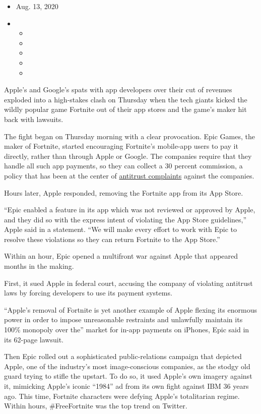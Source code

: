 \begin{itemize}
\item
  Aug. 13, 2020
\item
  \begin{itemize}
  \item
  \item
  \item
  \item
  \item
  \end{itemize}
\end{itemize}

Apple's and Google's spats with app developers over their cut of
revenues exploded into a high-stakes clash on Thursday when the tech
giants kicked the wildly popular game Fortnite out of their app stores
and the game's maker hit back with lawsuits.

The fight began on Thursday morning with a clear provocation. Epic
Games, the maker of Fortnite, started encouraging Fortnite's mobile-app
users to pay it directly, rather than through Apple or Google. The
companies require that they handle all such app payments, so they can
collect a 30 percent commission, a policy that has been at the center of
\href{https://www.nytimes3xbfgragh.onion/2020/06/16/business/apple-app-store-european-union-antitrust.html}{antitrust
complaints} against the companies.

Hours later, Apple responded, removing the Fortnite app from its App
Store.

``Epic enabled a feature in its app which was not reviewed or approved
by Apple, and they did so with the express intent of violating the App
Store guidelines,'' Apple said in a statement. ``We will make every
effort to work with Epic to resolve these violations so they can return
Fortnite to the App Store.''

Within an hour, Epic opened a multifront war against Apple that appeared
months in the making.

First, it sued Apple in federal court, accusing the company of violating
antitrust laws by forcing developers to use its payment systems.

``Apple's removal of Fortnite is yet another example of Apple flexing
its enormous power in order to impose unreasonable restraints and
unlawfully maintain its 100\% monopoly over the'' market for in-app
payments on iPhones, Epic said in its 62-page lawsuit.

Then Epic rolled out a sophisticated public-relations campaign that
depicted Apple, one of the industry's most image-conscious companies, as
the stodgy old guard trying to stifle the upstart. To do so, it used
Apple's own imagery against it, mimicking Apple's iconic ``1984'' ad
from its own fight against IBM 36 years ago. This time, Fortnite
characters were defying Apple's totalitarian regime. Within hours,
\#FreeFortnite was the top trend on Twitter.

